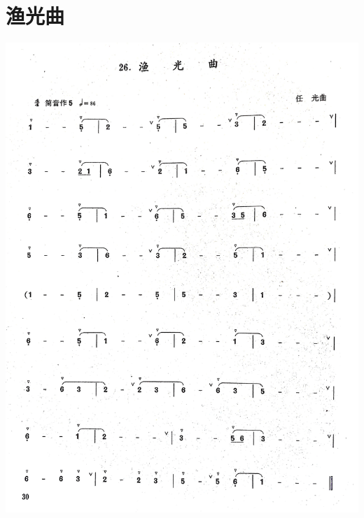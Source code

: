 \documentclass[cn,pad,chinese,chinesefont=nofont]{elegantbook}
\begin{document}
\section{渔光曲}           
	\includegraphics[width=\textwidth]{dongxiao/IMG_0939.jpg}   
\end{document}
